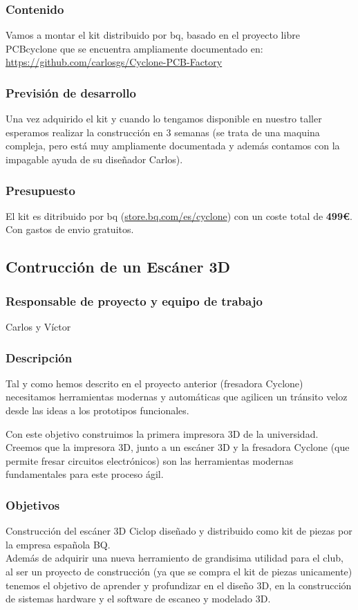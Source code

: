 \documentclass[12pt,twoside]{report}
\begin{document}
\subsubsection{Contenido}
Vamos a montar el kit distribuido por bq, basado en el proyecto libre PCBcyclone que se encuentra ampliamente documentado en: \url{https://github.com/carlosgs/Cyclone-PCB-Factory}

\subsubsection{Previsión de desarrollo}
Una vez adquirido el kit y cuando lo tengamos disponible en nuestro taller esperamos realizar la construcción en 3 semanas (se trata de una maquina compleja, pero está muy ampliamente documentada y además contamos con la impagable ayuda de su diseñador Carlos).

\subsubsection{Presupuesto}
El kit es ditribuido por bq (\url{store.bq.com/es/cyclone}) con un coste total de {\bf 499\euro{}}. Con gastos de envio gratuitos.

\subsection{Contrucción de un Escáner 3D}
\subsubsection{Responsable de proyecto y equipo de trabajo}
Carlos y Víctor
\subsubsection{Descripción}
 Tal y como hemos descrito en el proyecto anterior (fresadora Cyclone) necesitamos herramientas modernas y automáticas que agilicen un tránsito veloz desde las ideas a los prototipos funcionales.

Con este objetivo construimos la primera impresora 3D de la universidad. Creemos que la impresora 3D, junto a un escáner 3D y la fresadora Cyclone (que permite fresar circuitos electrónicos) son las herramientas modernas fundamentales para este proceso ágil.

\subsubsection{Objetivos}
Construcción del escáner 3D Ciclop diseñado y distribuido como kit de piezas por la empresa española BQ.\\
Además de adquirir una nueva herramiento de grandisima utilidad para el club, al ser un proyecto de construcción (ya que se compra el kit de piezas unicamente) tenemos el objetivo de aprender y profundizar en el diseño 3D, en la construcción de sistemas hardware y el software de escaneo y modelado 3D.
\end{document}
